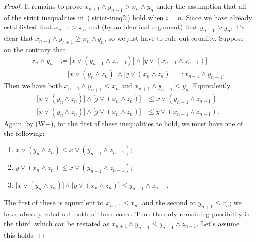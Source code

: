 \begin{proof}
It remains to prove $x_{n+1} \wedge y_{n+1} > x_n \wedge y_n$ under the assumption 
that all of the strict inequalities in~(\ref{strict-ineq2}) hold when $i=n$.
Since we have already established that $x_{n+1} > x_n$ and (by an identical argument)
that $y_{n+1} > y_n$, it's clear that $x_{n+1} \wedge y_{n+1}  \geq x_n \wedge y_n$,
so we just have to rule out equality.  Suppose on the contrary that  
\begin{align*}
x_n \wedge y_n &:= \bigl[x \vee (y_{n-1} \wedge z_{n-1})\bigr] \wedge 
\bigl[y \vee (x_{n-1} \wedge z_{n-1})\bigr]\\
&= \bigl[x \vee (y_n \wedge z_n) \bigr] \wedge \bigl[y \vee (x_n \wedge z_n)\bigr] =: x_{n+1} \wedge y_{n+1}.
\end{align*}
Then we have both $x_{n+1} \wedge y_{n+1} \leq x_{n}$ and $x_{n+1} \wedge y_{n+1} \leq y_{n}$.
Equivalently,
\begin{align}
\bigl[x \vee (y_{n} \wedge z_{n})\bigr] \wedge 
\bigl[y \vee (x_{n} \wedge z_{n})\bigr] &\leq x \vee (y_{n-1} \wedge z_{n-1})\nonumber\\
\bigl[x \vee (y_{n} \wedge z_{n})\bigr] \wedge 
\bigl[y \vee (x_{n} \wedge z_{n})\bigr] &\leq y \vee (x_{n-1} \wedge z_{n-1}).\label{ineqs}
\end{align}
Again, by (W+), for the first of these inequalities to hold, we must have one of the following:
\begin{enumerate}
\item $x \vee (y_{n} \wedge z_{n})\leq x \vee (y_{n-1} \wedge z_{n-1})$;
\item $y \vee (x_{n} \wedge z_{n}) \leq x \vee (y_{n-1} \wedge z_{n-1})$;
\item $\bigl[x \vee (y_{n} \wedge z_{n})\bigr] \wedge 
\bigl[y \vee (x_{n} \wedge z_{n})\bigr] \leq y_{n-1} \wedge z_{n-1}$.
\end{enumerate}
The first of these is equivalent to $x_{n+1} \leq x_{n}$, and the second to 
$y_{n+1} \leq x_n$; we have already ruled out both of these cases.
Thus the only remaining possibility is the third, which can be restated as 
$x_{n+1} \wedge y_{n+1} \leq y_{n-1} \wedge z_{n-1}$. Let's assume this holds.


\end{proof}
